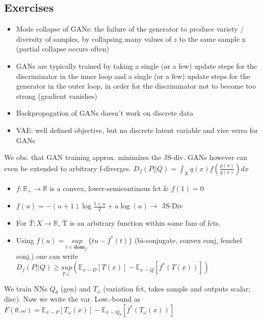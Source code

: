 \subsection{Exercises}
\begin{itemize}
    \item Mode collapse of GANs: the failure of the generator to produce variety / diversity of samples, by collapsing many values of $z$ to the same sample x (partial collapse occurs often)
    \item GANs are typically trained by taking a single (or a few) update steps for the discriminator in the inner loop and a single (or a few) update steps for the generator in the outer loop, in order for the discriminator not to become too strong (gradient vanishes)
    \item Backpropagation of GANs doesn't work on discrete data
    \item VAE: well defined objective, but no discrete latent variable and vice versa for GANs
\end{itemize} 
We obs. that GAN training approx. minimizes the JS-div. GANs however can even be extended to arbitrary f-diverges. \(D_f(P||Q)=\int_Xq(x)f(\frac{p(x)}{q(x)})dx\)
\begin{itemize}
    \item \(f:\mathbb{R}_+\rightarrow \mathbb{R}\) is a convex, lower-semicontinous fct \& \(f(1)=0\)
    \item \(f(u)=-(u+1)\log\frac{1+u}{2} + u\log(u)\rightarrow\) JS-Div
    \item For \(T:X\rightarrow\mathbb{R}\), T is an arbitrary function within some fam of fcts.
    \item Using \(f(u)=\underset{t\in\mathbf{dom}_{f^*}}{sup}\{tu-f^*(t)\}\) (bi-conjugate, convex conj, fenchel conj.) one can write \(D_f(P||Q) \geq \underset{T\in}{sup}(\mathbb{E}_{x\sim D}[T(x)]-\mathbb{E}_{x\sim Q}[f^*(T(x))])\)

\end{itemize}
We train NNs \(Q_\theta\) (gen) and $T_\omega$ (variation fct, takes sample and outputs scalar; disc). Now we write the var. Low.-bound as \(F(\theta,\omega)=\mathbb{E}_{x\sim P}[T_\omega(x)]-\mathbb{E}_{x\sim Q_\theta}[f^*(T_\omega(x))]\)
